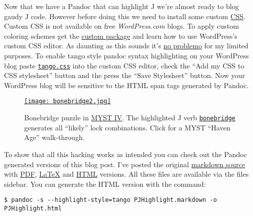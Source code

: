 Now that we have a Pandoc that can highlight J we're almost ready to
blog gaudy J code. However before doing this we need to install some
\captionsetup[floatingfigure]{labelformat=empty}
custom \href{http://www.htmldog.com/guides/cssbeginner/}{CSS}. Custom
CSS is not available on free \emph{WordPress.com} blogs. To apply custom
coloring schemes get the
\href{http://en.support.wordpress.com/custom-design/}{custom package}
and learn how to use WordPress's custom CSS editor. As daunting as this
sounds it's \href{http://www.youtube.com/watch?v=4QWfrxYt9DQ}{no
problemo} for my limited purposes. To enable tango style pandoc syntax
highlighting on your WordPress blog paste 
\href{https://www.box.com/s/dklf0lofp7pc1k98i3h2}{\texttt{tango.css}}
into the custom CSS editor, check the ``Add my CSS to CSS stylesheet'' button and
the press the ``Save Stylesheet'' button. Now your WordPress blog will
be sensitive to the HTML span tags generated by Pandoc.

\captionsetup[figure]{labelformat=empty}
\begin{SCfigure}
\centering
\href{http://www.youtube.com/watch?v=GW8zcbr9Zko}{\texttt{[image: bonebridge2.jpg]}}
\caption{Bonebridge puzzle in
\href{http://en.wikipedia.org/wiki/Myst\_IV:\_Revelation}{MYST IV}.
The highlighted J verb \href{https://www.box.com/s/zgnyhgsamlxbqvkw7r4t}{\texttt{bonebridge}} generates all ``likely'' lock combinations.
Click for a MYST ``Haven Age'' walk-through.}
\label{fig:3202X0}
\end{SCfigure}

To show that all this hacking works as intended you can check out the
Pandoc generated versions of this blog post. I've posted the original
\href{https://www.box.com/s/ld5l7y9v7ueo6ml37mqu}{markdown source} with
\href{https://www.box.com/s/0ogxgtmrrzicrn5o9o51}{PDF},
\href{https://www.box.com/s/zbcragtg35tgmciunnpp}{LaTeX} and
\href{https://www.box.com/s/q8lza89lf1s1s5161qkz}{HTML} versions. All
these files are available via the files sidebar. You can generate the
HTML version with the command:

\footnotesize
\begin{tcolorbox}[breakable, size=fbox, boxrule=1pt, pad at break*=1mm,colback=cellbackground, colframe=cellborder]
\begin{verbatim}
$ pandoc -s --highlight-style=tango PJHighlight.markdown -o PJHighlight.html
\end{verbatim}
\end{tcolorbox}
\normalsize

